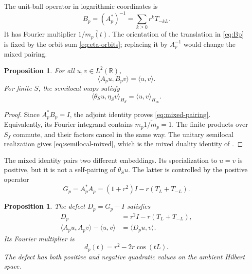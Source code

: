\documentclass[11pt,letterpaper]{article}
\newtheorem{proposition}[theorem]{Proposition}
\theoremstyle{definition}
\theoremstyle{remark}
\newcommand{\R}{\mathbb R}
\begin{document}
The unit-ball operator in logarithmic coordinates is
\begin{equation}\label{eq:Bp}
 B_p=(A_p^*)^{-1}=\sum_{k\ge0}r^kT_{-kL}.
\end{equation}
It has Fourier multiplier $1/\overline{m_p(t)}$. The orientation of
the translation in \eqref{eq:Bp} is fixed by the orbit sum
\eqref{eq:eta-orbits}; replacing it by $A_p^{-1}$ would change the
mixed pairing.

\begin{proposition}\label{prop:local-correspondence:mixed}
For all $u,v\in L^2(\R)$,
\begin{equation}\label{eq:mixed-pairing}
 \langle A_pu,B_pv\rangle=\langle u,v\rangle.
\end{equation}
For finite $S$, the semilocal maps satisfy
\begin{equation}\label{eq:semilocal-mixed}
 \langle\theta_Su,\eta_Sv\rangle_{H_S}
   =\langle u,v\rangle_{H_\infty}.
\end{equation}
\end{proposition}

\begin{proof}
Since $A_p^*B_p=I$, the adjoint identity proves
\eqref{eq:mixed-pairing}. Equivalently, its Fourier integrand contains
$m_p\overline{1/\overline{m_p}}=1$. The finite products over $S_f$
commute, and their factors cancel in the same way. The unitary
semilocal realization gives \eqref{eq:semilocal-mixed}, which is the
mixed duality identity of \cite[Section 4.7]{CCM}.
\end{proof}

The mixed identity pairs two different embeddings. Its specialization
to $u=v$ is positive, but it is not a self-pairing of $\theta_Su$.
The latter is controlled by the positive operator
\begin{equation}\label{eq:Gp}
 G_p=A_p^*A_p=(1+r^2)I-r(T_L+T_{-L}).
\end{equation}

\begin{proposition}\label{prop:local-correspondence:defect}
The defect $D_p=G_p-I$ satisfies
\begin{align}
 D_p&=r^2I-r(T_L+T_{-L}),\label{eq:Dp}\\
 \langle A_pu,A_pv\rangle-\langle u,v\rangle
   &=\langle D_pu,v\rangle.\label{eq:metric-defect}
\end{align}
Its Fourier multiplier is
\begin{equation}\label{eq:dp-symbol}
 d_p(t)=r^2-2r\cos(tL).
\end{equation}
The defect has both positive and negative quadratic values on the
ambient Hilbert space.
\end{proposition}
\end{document}
